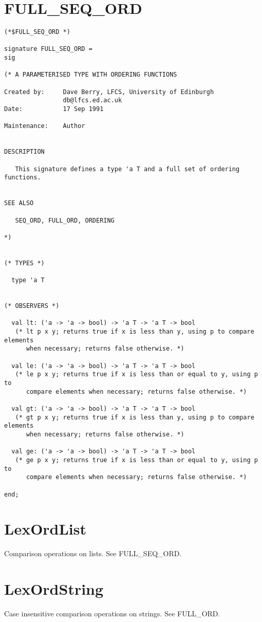 \section{FULL\_SEQ\_ORD}
\begin{verbatim}
(*$FULL_SEQ_ORD *)

signature FULL_SEQ_ORD =
sig

(* A PARAMETERISED TYPE WITH ORDERING FUNCTIONS

Created by:     Dave Berry, LFCS, University of Edinburgh
                db@lfcs.ed.ac.uk
Date:           17 Sep 1991

Maintenance:    Author


DESCRIPTION

   This signature defines a type 'a T and a full set of ordering functions.


SEE ALSO

   SEQ_ORD, FULL_ORD, ORDERING

*)


(* TYPES *)

  type 'a T


(* OBSERVERS *)

  val lt: ('a -> 'a -> bool) -> 'a T -> 'a T -> bool
   (* lt p x y; returns true if x is less than y, using p to compare elements
      when necessary; returns false otherwise. *)

  val le: ('a -> 'a -> bool) -> 'a T -> 'a T -> bool
   (* le p x y; returns true if x is less than or equal to y, using p to
      compare elements when necessary; returns false otherwise. *)

  val gt: ('a -> 'a -> bool) -> 'a T -> 'a T -> bool
   (* gt p x y; returns true if x is less than y, using p to compare elements
      when necessary; returns false otherwise. *)

  val ge: ('a -> 'a -> bool) -> 'a T -> 'a T -> bool
   (* ge p x y; returns true if x is less than or equal to y, using p to
      compare elements when necessary; returns false otherwise. *)

end;
\end{verbatim}

\newpage
\section{LexOrdList}
Comparison operations on lists.  See FULL\_SEQ\_ORD.

\section{LexOrdString}
Case insensitive comparison operations on strings.  See FULL\_ORD.

